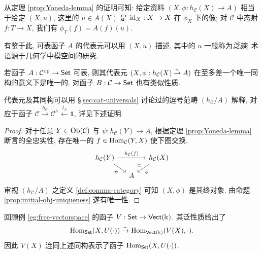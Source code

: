 \begin{remark}\label{rem:Yoneda-universal-family}
	从定理 \ref{prop:Yoneda-lemma} 的证明可知: 给定资料 $(X, \phi: h_{\mathcal{C}}(X) \to A)$ 相当于给定 $(X, u)$, 这里的 $u \in A(X)$ 是 $\mathrm{id}_X: X \to X$ 在 $\phi_X$ 下的像; 对 $\mathcal{C}$ 中态射 $f: T \to X$, 我们有 $\phi_T(f) = A(f)(u)$.
	
	有鉴于此, 可表函子 $A$ 的代表元可以用 $(X, u)$ 描述, 其中的 $u$ 一般称为\emph{泛族}; 术语源于几何学中模空间的研究.
\end{remark}

\begin{lemma}\label{prop:representable-functor-uniqueness}
	若函子 $A: \mathcal{C}^\text{op} \to \mathsf{Set}$ 可表, 则其代表元 $(X, \phi: h_{\mathcal{C}}(X) \stackrel{\sim}{\rightarrow} A)$ 在至多差一个唯一同构的意义下是唯一的. 对函子 $B: \mathcal{C} \to \mathsf{Set}$ 也有类似性质.
\end{lemma}

代表元及其同构可以用  \S\ref{sec:cat-universals} 讨论过的逗号范畴 $(h_{\mathcal{C}} / A)$ 解释, 对应于函子 $\mathcal{C} \xrightarrow{h_{\mathcal{C}}} \mathcal{C}^\wedge \xleftarrow{j_A} \mathbf{1}$, 详见下述证明.
\begin{proof}
	对于任意 $Y \in \operatorname{Ob}(\mathcal{C})$ 与 $\psi: h_{\mathcal{C}}(Y) \to A$, 根据定理 \ref{prop:Yoneda-lemma} 断言的全忠实性, 存在唯一的 $f \in \operatorname{Hom}_{\mathcal{C}}(Y, X)$ 使下图交换.
	\[\begin{tikzcd}[column sep=small, row sep=small]
		h_{\mathcal{C}}(Y) \arrow[rd, "\psi"'] \arrow[rr, "h_{\mathcal{C}}(f)"] & & h_{\mathcal{C}}(X) \arrow[ld, "\phi", "\simeq"'] \\
		 & A &
	\end{tikzcd}\]
	审视 $(h_{\mathcal{C}} / A)$ 之定义 \ref{def:comma-category} 可知 $(X, \phi)$ 是其终对象. 由命题 \ref{prop:initial-obj-uniqueness} 遂有唯一性.
\end{proof}

\begin{example}
	回顾例 \ref{eg:free-vectorspace} 的函子 $V: \mathsf{Set} \to \mathsf{Vect}(\Bbbk)$. 其泛性质给出了
	\[ \operatorname{Hom}_{\mathsf{Set}}(X, U(\cdot)) \stackrel{\sim}{\rightarrow} \operatorname{Hom}_{\mathsf{Vect}(\Bbbk)}(V(X), \cdot). \]
	因此 $V(X)$ 连同上述同构表示了函子 $\operatorname{Hom}_{\mathsf{Set}}(X, U(\cdot))$.
\end{example}

